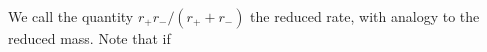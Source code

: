 We call the quantity \(r_+r_-/(r_++r_-)\) the reduced rate, with analogy to the reduced mass.  Note that if 